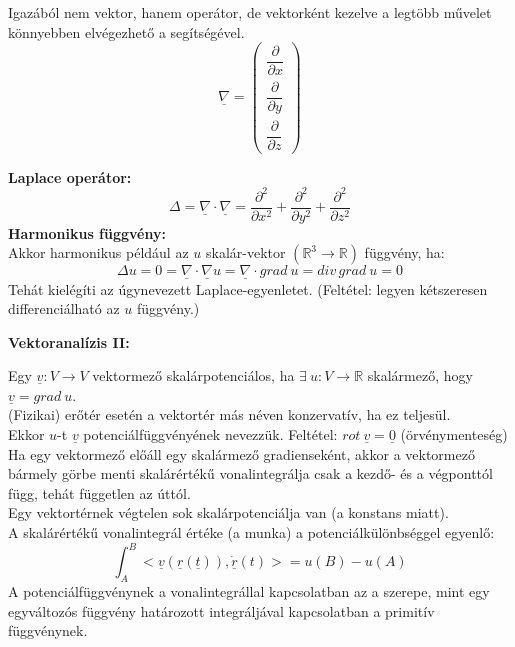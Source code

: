 \documentclass[11pt,a4paper]{article}
\begin{document}
    \begin{tcolorbox}[colback=red!5!white,colframe=red!60!black,title= 5. Nabla vektor]
    Igazából nem vektor, hanem operátor, de vektorként kezelve a legtöbb művelet könnyebben
    elvégezhető a segítségével.
    $$\underline{\nabla} = 
    \begin{pmatrix}
        \dfrac{\partial}{\partial x}\\[8pt]
        \dfrac{\partial}{\partial y}\\[8pt]
        \dfrac{\partial}{\partial z}
    \end{pmatrix}$$
    \end{tcolorbox}

    \begin{tcolorbox}[colback=red!5!white,colframe=red!60!black,title= 6. Laplace operátor{,} harmonikus függvény]
    \textbf{Laplace operátor:}
    $$\Delta = \underline{\nabla} \cdot \underline{\nabla} = \frac{\partial^2}{\partial x^2} + \frac{\partial^2}{\partial y^2} + \frac{\partial^2}{\partial z^2}$$
    \textbf{Harmonikus függvény:} \\
    Akkor harmonikus például az $u$ skalár-vektor $(\mathbb{R}^3 \rightarrow \mathbb{R})$ függvény, ha:
    $$\Delta u = 0 = \underline{\nabla} \cdot \underline{\nabla}u = \underline{\nabla} \cdot grad\ u = div\,grad\ u = 0$$
    Tehát kielégíti az úgynevezett Laplace-egyenletet. (Feltétel: legyen kétszeresen differenciálható az $u$ függvény.)
    \end{tcolorbox}

\newpage
\textbf{Vektoranalízis II:}

    \begin{tcolorbox}[colback=red!5!white,colframe=red!60!black,title= 1. Skalárpotenciálos vektormező]
    Egy $\underline{v}:V \rightarrow V$ vektormező skalárpotenciálos, ha $\exists\ u: V \rightarrow \mathbb{R}$ skalármező, hogy $\underline{v} = grad\ u$.\\
    (Fizikai) erőtér esetén a vektortér más néven konzervatív, ha ez teljesül.\\
    Ekkor $u$-t $\underline{v}$ potenciálfüggvényének nevezzük. Feltétel: $rot\ \underline{v} = \underline{0}$ (örvénymenteség) \\
    Ha egy vektormező előáll egy skalármező gradienseként, akkor a vektormező bármely görbe menti skalárértékű vonalintegrálja csak a kezdő- és a végponttól függ, tehát független az úttól.\\
    Egy vektortérnek végtelen sok skalárpotenciálja van (a konstans miatt).\\ 
    A skalárértékű vonalintegrál értéke (a munka) a potenciálkülönbséggel egyenlő:
    $$\int_{A}^{B} <\underline{v}(\underline{r}(\underline{t})), \underline{\dot{r}}(t)> = u(B) - u(A)$$
    A potenciálfüggvénynek a vonalintegrállal kapcsolatban az a szerepe, mint egy egyváltozós függvény határozott integráljával kapcsolatban a primitív függvénynek.
    \end{tcolorbox}
\end{document}
